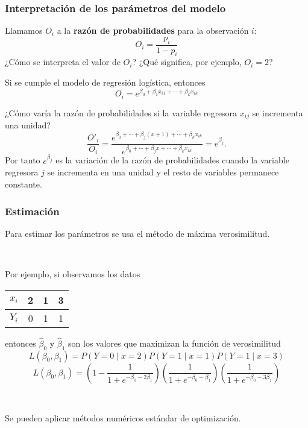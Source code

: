 \documentclass{beamer}
\begin{document}
\begin{frame}[plain]
\frametitle{Interpretación de los parámetros del modelo}

Llamamos $O_i$ a la \textbf{razón de probabilidades} para la observación $i$:
\[
 O_i=\frac{p_i}{1-p_i} 
\]
¿Cómo se interpreta el valor de $O_i$? ¿Qué significa, por ejemplo, $O_i=2$?




Si se cumple el modelo de regresión logística, entonces
\[
O_i =  e^{\beta_0  + \beta_1x_{i1} + \cdots + \beta_kx_{ik}}
\]


¿Cómo varía la razón de probabilidades si la variable regresora $x_{ij}$ se incrementa una unidad?
\[
\frac{O'_i}{O_i} = \frac{e^{\beta_0+\cdots+\beta_j(x+1)+\cdots+\beta_kx_{ik}}}{e^{\beta_0+\cdots+\beta_jx+\cdots+\beta_kx_{ik}}}= e^{\beta_j}.
\]  
Por tanto $e^{\beta_j}$ es la variación de la razón de probabilidades cuando la variable regresora $j$ se incrementa en una unidad y el resto de variables permanece constante. 


\end{frame}
\begin{frame}[plain]
\frametitle{Estimación}

Para estimar los parámetros se usa el método de máxima verosimilitud.

\

Por ejemplo, si observamos los datos

\begin{center}
\begin{tabular}{c|ccc}
$x_i$ & 2 & 1 & 3 \\  \hline
$Y_i$ & 0 & 1 & 1
\end{tabular}
\end{center}

entonces $\hat{\beta}_0$ y $\hat{\beta}_1$ son los valores que maximizan la función de verosimilitud
\[
L(\beta_0,\beta_1) = P(Y=0 \mid x = 2)P(Y=1 \mid x = 1)P(Y=1 \mid x = 3)
\]
\[
L(\beta_0,\beta_1) = \left(1-\frac{1}{1+e^{-\beta_0-2\beta_1}}\right)
\left(\frac{1}{1+e^{-\beta_0-\beta_1}}\right)
\left(\frac{1}{1+e^{-\beta_0-3\beta_1}}\right)
\]

\

Se pueden aplicar métodos numéricos estándar de optimización.

\end{frame}
\end{document}
